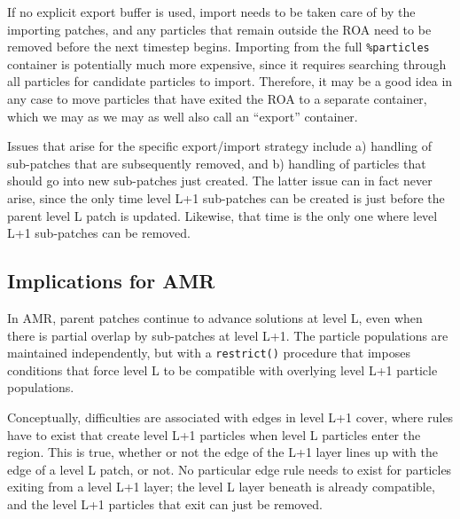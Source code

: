 \documentclass[paper=a4,fontsize=11pt]{scrartcl}
\numberwithin{equation}{section}		%
\numberwithin{figure}{section}			%
\numberwithin{table}{section}				%
\newcommand{\codecolor}{\color{Blue}}
\newcommand{\Code}[1]{{\codecolor\texttt{#1}}}
\begin{document}
If no explicit export buffer is used, import needs to be taken care of by the importing patches, and any particles that remain outside the ROA need to be removed before the next timestep begins.  Importing from the full \Code{\%particles} container is potentially much more expensive, since it requires searching through all particles for candidate particles to import.  Therefore, it may be a good idea in any case to move particles that have exited the ROA to a separate container, which we may as we may as well also call an ``export'' container.

Issues that arise for the specific export/import strategy include a) handling of sub-patches that are subsequently removed, and b) handling of particles that should go into new sub-patches just created.  The latter issue can in fact never arise, since the only time level L+1 sub-patches can be created is just before the parent level L patch is updated.   Likewise, that time is the only one where level L+1 sub-patches can be removed.

\subsection{Implications for AMR}
In AMR, parent patches continue to advance solutions at level L, even when there is partial overlap by sub-patches at level L+1.  The particle populations are maintained independently, but with a \Code{restrict()} procedure that imposes conditions that force level L to be compatible with overlying level L+1 particle populations.

Conceptually, difficulties are associated with edges in level L+1 cover, where rules have to exist that create level L+1 particles when level L particles enter the region.  This is true, whether or not the edge of the L+1 layer lines up with the edge of a level L patch, or not.   No particular edge rule needs to exist for particles exiting from a level L+1 layer; the level L layer beneath is already compatible, and the level L+1 particles that exit can just be removed.
\end{document}

